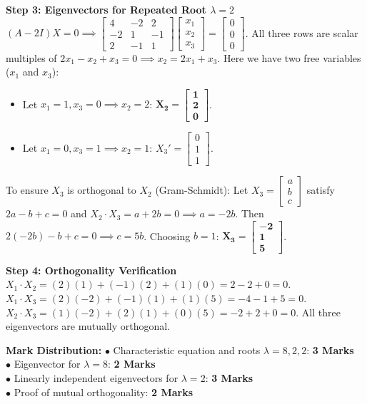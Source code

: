 \begin{solutionbox}
\textbf{Step 3: Eigenvectors for Repeated Root $\lambda = 2$}
$(A - 2I)X = 0 \implies \begin{bmatrix} 4 & -2 & 2 \\ -2 & 1 & -1 \\ 2 & -1 & 1 \end{bmatrix} \begin{bmatrix} x_1 \\ x_2 \\ x_3 \end{bmatrix} = \begin{bmatrix} 0 \\ 0 \\ 0 \end{bmatrix}$.
All three rows are scalar multiples of $2x_1 - x_2 + x_3 = 0 \implies x_2 = 2x_1 + x_3$.
Here we have two free variables ($x_1$ and $x_3$):
\begin{itemize}[leftmargin=6mm]
    \item Let $x_1 = 1, x_3 = 0 \implies x_2 = 2$: $\mathbf{X_2 = \begin{bmatrix} 1 \\ 2 \\ 0 \end{bmatrix}}$.
    \item Let $x_1 = 0, x_3 = 1 \implies x_2 = 1$: $X_3' = \begin{bmatrix} 0 \\ 1 \\ 1 \end{bmatrix}$.
\end{itemize}
To ensure $X_3$ is orthogonal to $X_2$ (Gram-Schmidt):
Let $X_3 = \begin{bmatrix} a \\ b \\ c \end{bmatrix}$ satisfy $2a - b + c = 0$ and $X_2 \cdot X_3 = a + 2b = 0 \implies a = -2b$.
Then $2(-2b) - b + c = 0 \implies c = 5b$. Choosing $b = 1$: $\mathbf{X_3 = \begin{bmatrix} -2 \\ 1 \\ 5 \end{bmatrix}}$.

\textbf{Step 4: Orthogonality Verification}
$X_1 \cdot X_2 = (2)(1) + (-1)(2) + (1)(0) = 2 - 2 + 0 = 0$.
$X_1 \cdot X_3 = (2)(-2) + (-1)(1) + (1)(5) = -4 - 1 + 5 = 0$.
$X_2 \cdot X_3 = (1)(-2) + (2)(1) + (0)(5) = -2 + 2 + 0 = 0$.
All three eigenvectors are mutually orthogonal.

\begin{markingrubric}
\textbf{Mark Distribution:}
$\bullet$ Characteristic equation and roots $\lambda = 8, 2, 2$: \textbf{3 Marks}\\
$\bullet$ Eigenvector for $\lambda = 8$: \textbf{2 Marks}\\
$\bullet$ Linearly independent eigenvectors for $\lambda = 2$: \textbf{3 Marks}\\
$\bullet$ Proof of mutual orthogonality: \textbf{2 Marks}
\end{markingrubric}
\end{solutionbox}

